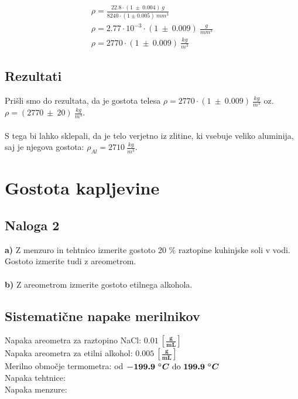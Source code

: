 \documentclass{report}
\begin{document}
\begin{equation}
  \label{eq:1}
  \begin{gathered}
    \rho = \frac{22.8 \cdot (1 \ \pm \ 0.004)\ g}{8240 \cdot (1 \pm 0.005) \ mm^3} \\
    \rho = 2.77 \cdot 10^{-3} \cdot (1 \ \pm \ 0.009) \ \frac{g}{mm^3} \\
    \rho = 2770 \cdot (1 \ \pm \ 0.009) \ \frac{kg}{m^3}
  \end{gathered}
\end{equation}

\subsection{Rezultati}
Prišli smo do rezultata, da je gostota telesa $\rho = 2770 \cdot (1 \ \pm \ 0.009) \ \frac{kg}{m^3}$ oz. 
$\rho = (2770 \ \pm \ 20) \ \frac{kg}{m^3}$.
\\\\
S tega bi lahko sklepali, da je telo verjetno iz zlitine, ki vsebuje veliko aluminija, saj je njegova gostota: 
$\rho_{Al} = 2710 \ \frac{kg}{m^3}$.


\pagebreak

\section{Gostota kapljevine}
\subsection{Naloga 2}
\textbf{a)} Z menzuro in tehtnico izmerite gostoto 20 \% raztopine kuhinjske soli v vodi. Gostoto izmerite tudi z areometrom.\\\\
\textbf{b)} Z areometrom izmerite gostoto etilnega alkohola.

\subsection{Sistematične napake merilnikov}
Napaka areometra za raztopino NaCl: $\bm{0.01 \ \left[ \frac{g}{mL} \right]}$ \\
Napaka areometra za etilni alkohol: $\bm{0.005 \ \left[ \frac{g}{mL} \right]}$ \\
Merilno območje termometra: od $\bm{-199.9\ ^{\circ}C$} do \bm{$199.9\ ^{\circ}C}$ \\
Napaka tehtnice:  \\
Napaka menzure: 
\\
\end{document}
